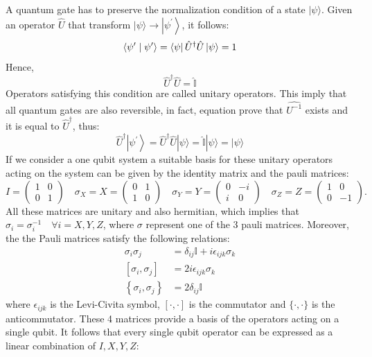 A quantum gate has to preserve the normalization condition of a state $|\psi\rangle$. Given an operator $\hat{U}$ that transform $|\psi\rangle \rightarrow\left|\psi^{\prime}\right\rangle$, it follows:
$$
\left\langle\psi^{\prime} \mid \psi^{\prime}\right\rangle =\bra{\psi}\hat{U}^{\dagger} \hat{U}\ket{\psi}=1
$$
Hence, 
$$
 \hat{U}^{\dagger} \hat{U}=\widehat{\mathbb{I}}
$$
Operators satisfying this condition are called unitary operators. This imply that all quantum gates are also reversible, in fact, equation  prove that $\hat{U^{-1}}$ exists and it is equal to $\hat{U}^{\dagger}$, thus:
$$
\hat{U}^{\dagger}\left|\psi^{\prime}\right\rangle=\hat{U}^{\dagger} \hat{U}|\psi\rangle=\hat{\mathbb{I}}|\psi\rangle=|\psi\rangle
$$
If we consider a one qubit system a suitable basis for these unitary operators acting on the system can be given by the identity matrix and the pauli matrices: 
$$
I=\left(\begin{array}{cc}
1 & 0 \\
0 & 1
\end{array}\right) \quad  \sigma_X=X=\left(\begin{array}{cc}
0 & 1 \\
1 & 0
\end{array}\right) \quad 
\sigma_Y=Y=\left(\begin{array}{cc}
0 & -i \\
i & 0
\end{array}\right) \quad
\sigma_Z=Z=\left(\begin{array}{cc}
1 & 0 \\
0 & -1
\end{array}\right).
$$
All these matrices are unitary and also hermitian, which implies that $\sigma_i=\sigma_i^{-1} \quad \forall i = X,Y,Z$, where $\sigma$ represent one of the 3 pauli matrices. Moreover, the the Pauli matrices satisfy the following relations:
$$
\begin{aligned}
\sigma_{i} \sigma_{j} &=\delta_{i j} \mathbb{I}+i \epsilon_{i j k} \sigma_{k} \\
\left[\sigma_{i}, \sigma_{j}\right] &=2 i \epsilon_{i j k} \sigma_{k} \\
\left\{\sigma_{i}, \sigma_{j}\right\} &=2 \delta_{i j} \mathbb{I}
\end{aligned}
$$
where $\epsilon_{i j k}$ is the Levi-Civita symbol, $[\cdot, \cdot]$ is the commutator and $\{\cdot, \cdot\}$ is the
anticommutator.
These 4 matrices provide a basis of the operators acting on a single qubit. It follows that every single qubit operator can be expressed as a linear combination of $I,X,Y,Z$: 
